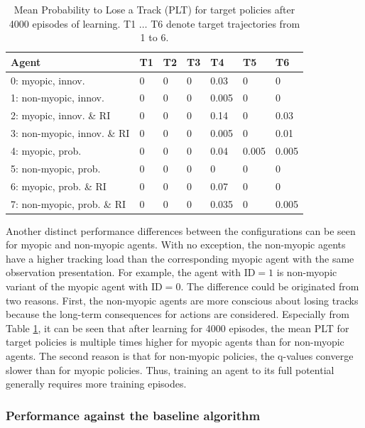 \documentclass[english, 12pt, a4paper, elec, utf8, a-1b, online]{aaltothesis}
\begin{document}
\begin{table}[tb]
    \centering
    \begin{tabular}{|l|l|l|l|l|l|l|}
        \hline
        \textbf{Agent} & \textbf{T1} & \textbf{T2} & \textbf{T3} & \textbf{T4} & \textbf{T5} & \textbf{T6} \\ \hline
        0: myopic, innov. & 0 & 0 & 0 & 0.03  & 0     & 0     \\ \hline
        1: non-myopic, innov. & 0 & 0 & 0 & 0.005 & 0     & 0     \\ \hline
        2: myopic, innov. \& RI & 0 & 0 & 0 & 0.14  & 0     & 0.03  \\ \hline
        3: non-myopic, innov. \& RI & 0 & 0 & 0 & 0.005 & 0     & 0.01  \\ \hline
        4: myopic, prob. & 0 & 0 & 0 & 0.04  & 0.005 & 0.005 \\ \hline
        5: non-myopic, prob. & 0 & 0 & 0 & 0     & 0     & 0     \\ \hline
        6: myopic, prob. \& RI & 0 & 0 & 0 & 0.07  & 0     & 0     \\ \hline
        7: non-myopic, prob. \& RI & 0 & 0 & 0 & 0.035 & 0     & 0.005 \\ \hline
    \end{tabular}
    \caption{Mean Probability to Lose a Track (PLT) for target policies after 4000 episodes of learning. T1 $\ldots$ T6 denote target trajectories from 1 to 6.}
    \label{tab:plt_comparison}
\end{table}

Another distinct performance differences between the configurations can be seen for myopic and non-myopic agents.
With no exception, the non-myopic agents have a higher tracking load than the corresponding myopic agent with the same observation presentation. 
For example, the agent with $\text{ID}=1$ is non-myopic variant of the myopic agent with $\text{ID}=0$.
The difference could be originated from two reasons.
First, the non-myopic agents are more conscious about losing tracks because the long-term consequences for actions are considered.
Especially from Table \ref{tab:plt_comparison}, it can be seen that after learning for 4000 episodes, the mean PLT for target policies is multiple times higher for myopic agents than for non-myopic agents.
The second reason is that for non-myopic policies, the q-values converge slower than for myopic policies. 
Thus, training an agent to its full potential generally requires more training episodes.


\subsubsection{Performance against the baseline algorithm} \label{sec:against_baseline}
\end{document}
